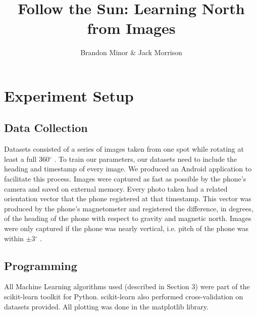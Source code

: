 \documentclass{article}
\begin{document}
\title{Follow the Sun: Learning North from Images}
\author{Brandon Minor \& Jack Morrison}
\maketitle


\newcommand{\degrees}{$^\circ$ }


\section{Experiment Setup}

\subsection{Data Collection}
Datasets consisted of a series of images taken from one spot while rotating at least a full 360\degrees.
To train our parameters, our datasets need to include the heading and timestamp of every image. We produced an Android application to facilitate this process. Images were captured as fast as possible by the phone's camera and saved on external memory. Every photo taken had a related orientation vector that the phone registered at that timestamp. This vector was produced by the phone's magnetometer and registered the difference, in degrees, of the heading of the phone with respect to gravity and magnetic north. Images were only captured if the phone was nearly vertical, i.e. pitch of the phone was within $\pm$3\degrees.

\subsection{Programming}
All Machine Learning algorithms used (described in Section 3) were part of the scikit-learn toolkit for Python. scikit-learn also performed cross-validation on datasets provided. All plotting was done in the matplotlib library. 
\end{document}
